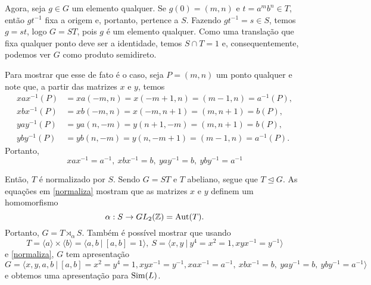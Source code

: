     	\par\vspace{0.3cm} Agora, seja $g\in G$ um elemento qualquer. Se $g(0) = (m,n)$ e $t = a^mb^n\in T$, 
    	então $gt^{-1}$ fixa a origem e, portanto, pertence a $S$. Fazendo $gt^{-1} = s\in S$, temos $g = st$,
    	logo $G = ST$, pois $g$ é um elemento qualquer. Como uma translação que fixa qualquer ponto deve ser a
    	identidade, temos $S\cap T = 1$ e, consequentemente, podemos ver $G$ como produto semidireto.
    	
    	\par\vspace{0.3cm} Para mostrar que esse de fato é o caso, seja $P = (m,n)$ um ponto qualquer e 
    	note que, a partir das matrizes $x$ e $y$, temos
    	\begin{align*}
        	xax^{-1}(P) &= xa(-m,n) = x(-m+1, n) = (m-1, n) = a^{-1}(P), \\
        	xbx^{-1}(P) &= xb(-m,n) = x(-m, n+1) = (m, n+1) = b(P), \\
        	yay^{-1}(P) &= ya(n,-m) = y(n+1,-m) = (m, n+1) = b(P), \\
        	yby^{-1}(P) &= yb(n,-m) = y(n,-m+1) = (m-1,n) = a^{-1}(P).
    	\end{align*}
    	Portanto,
    	\begin{equation}
    	\label{normaliza}
    	    xax^{-1} = a^{-1}, \ xbx^{-1} = b, \ yay^{-1} = b, \ yby^{-1} = a^{-1}
    	\end{equation}
    	\par\vspace{0.3cm} Então, $T$ é normalizado por $S$. Sendo $G=ST$ e $T$ abeliano, segue que
    	$T\trianglelefteq G$. As equações em \eqref{normaliza} mostram que as matrizes $x$ e $y$ definem 
    	um homomorfismo 
    	\begin{equation*}
    	    \alpha: S\to GL_2(\mathbb{Z}) = \operatorname{Aut}(T).
    	\end{equation*}
    	Portanto, $G = T\rtimes_{\alpha} S$. Também é possível mostrar que usando
    	\begin{equation*}
    	    T = \langle a \rangle \times \langle b \rangle = \langle a,b \ | \ [a,b]=1 \rangle, \ 
    	    S = \langle x,y \ | \ y^4=x^2=1, xyx^{-1} = y^{-1} \rangle
    	\end{equation*}
    	e \eqref{normaliza}, $G$ tem apresentação
    	\begin{equation*}
    	    G = \langle x,y,a,b \ | \ [a,b]=x^2=y^4=1,xyx^{-1} = y^{-1}, xax^{-1} = a^{-1}, \ 
    	    xbx^{-1} = b, \ yay^{-1} = b, \ yby^{-1} = a^{-1} \rangle
    	\end{equation*}
    	e obtemos uma apresentação para $\operatorname{Sim}(L)$.
    	
